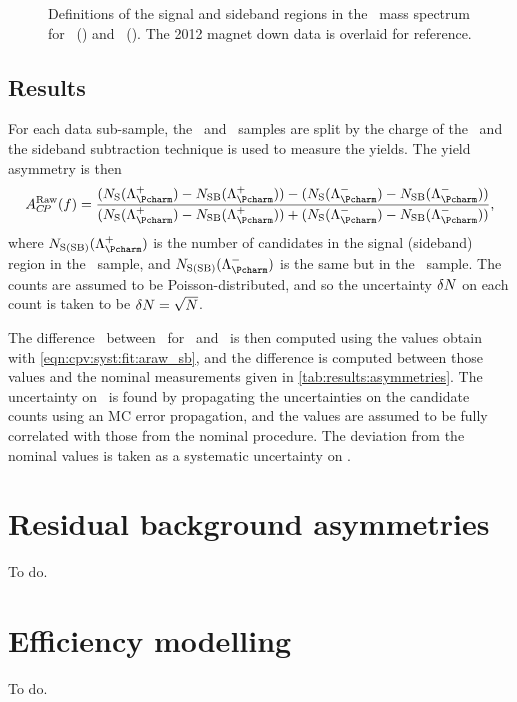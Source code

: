\begin{figure}
\begin{subfigure}[b]{0.5\textwidth}
    \caption{\ppipi}
    \label{fig:cpv:syst:mass_windows:ppipi}
  \end{subfigure}
  \caption{%
    Definitions of the signal and sideband regions in the \PLambdac\ mass 
    spectrum for \pKK~() and 
    \ppipi~().
    The 2012 magnet down data is overlaid for reference.
  }
  \label{fig:cpv:syst:mass_windows}
\end{figure}

\subsection{Results}
\label{chap:cpv:syst:fit:results}

For each data sub-sample, the \pKK\ and \ppipi\ samples are split by the charge 
of the \PLambdac\ and the sideband subtraction technique is used to measure the 
yields.
The yield asymmetry is then
\begin{equation}
  \ARaw(f) = \frac{%
    (N_{\text{S}}(\PLambdac) - N_{\text{SB}}(\PLambdac)) -
    (N_{\text{S}}(\APLambdac) - N_{\text{SB}}(\APLambdac))
  }{%
    (N_{\text{S}}(\PLambdac) - N_{\text{SB}}(\PLambdac)) +
    (N_{\text{S}}(\APLambdac) - N_{\text{SB}}(\APLambdac))
  },
  \label{eqn:cpv:syst:fit:araw_sb}
\end{equation}
where $N_{\text{S(SB)}}(\PLambdac)$ is the number of candidates in the signal 
(sideband) region in the \PLambdac\ sample, and $N_{\text{S(SB)}}(\APLambdac)$ 
is the same but in the \APLambdac\ sample.
The counts are assumed to be Poisson-distributed, and so the uncertainty 
$\delta{N}$ on each count is taken to be $\delta{N} = \sqrt{N}$.

The difference \dACP\ between \ARaw\ for \pKK\ and \ppipi\ is then computed 
using the values obtain with \cref{eqn:cpv:syst:fit:araw_sb}, and the 
difference is computed between those values and the nominal measurements given 
in \cref{tab:results:asymmetries}.
The uncertainty on \ARaw\ is found by propagating the uncertainties on the 
candidate counts using an \ac{MC} error propagation, and the values are assumed 
to be fully correlated with those from the nominal procedure.
The deviation from the nominal values is taken as a systematic uncertainty on 
\dACP\@.

\section{Residual background asymmetries}
\label{chap:cpv:syst:asym}

To do.

\section{Efficiency modelling}
\label{chap:cpv:syst:eff}

To do.
